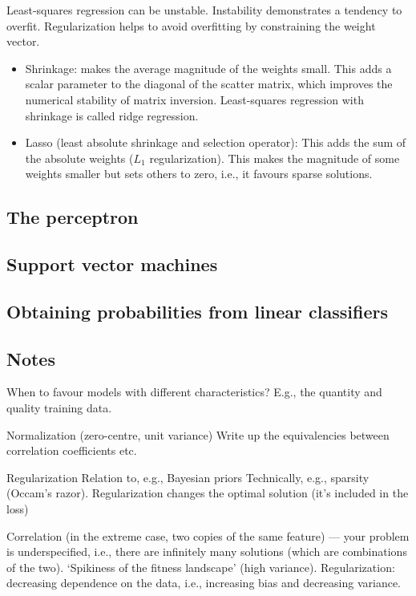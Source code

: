 Least-squares regression can be unstable.
Instability demonstrates a tendency to overfit.
Regularization helps to avoid overfitting by constraining the weight vector.

\begin{itemize}
      \item Shrinkage: makes the average magnitude of the weights small.
            This adds a scalar parameter to the diagonal of the scatter matrix,
            which improves the numerical stability of matrix inversion.
            Least-squares regression with shrinkage is called ridge regression.
      \item Lasso (least absolute shrinkage and selection operator): This adds the
            sum of the absolute weights ($L_1$ regularization).
            This makes the magnitude of some weights smaller but sets others to
            zero, i.e., it favours sparse solutions.
\end{itemize}

\subsection{The perceptron}

\subsection{Support vector machines}

\subsection{Obtaining probabilities from linear classifiers}


\subsection{Notes}

When to favour models with different characteristics?
E.g., the quantity and quality training data.

Normalization (zero-centre, unit variance)
Write up the equivalencies between correlation coefficients etc.

Regularization
Relation to, e.g., Bayesian priors
Technically, e.g., sparsity (Occam's razor).
Regularization changes the optimal solution (it's included in the loss)

Correlation (in the extreme case, two copies of the same feature) — your
problem is underspecified, i.e., there are infinitely many solutions (which are
combinations of the two).
`Spikiness of the fitness landscape' (high variance).
Regularization: decreasing dependence on the data, i.e., increasing bias and
decreasing variance.

